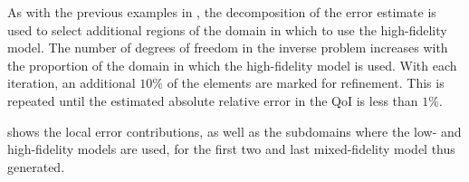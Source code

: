 \documentclass[review,sort&compress]{elsarticle}
\begin{document}
As with the previous examples in , the decomposition of the error estimate is used to select additional regions of the domain in which to use the high-fidelity model. The number of degrees of freedom in the inverse problem increases with the proportion of the domain in which the high-fidelity model is used. With each iteration, an additional $10\%$ of the elements are marked for refinement. This is repeated until the estimated absolute relative error in the QoI is less than $1\%$.

 shows the local error contributions, as well as the subdomains where the low- and high-fidelity models are used, for the first two and last mixed-fidelity model thus generated. 
%
\begin{figure}[htbp]
\centering
{} \\
 \\
\end{figure}
\end{document}
